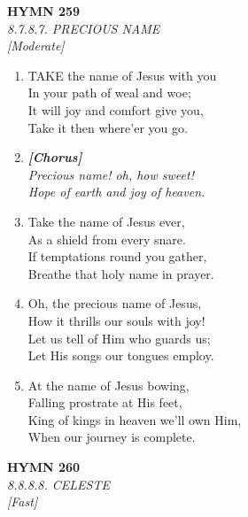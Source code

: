 \newpage
\begin{center}
    {\Large \textbf{HYMN 259}}
    \\
    \textit{8.7.8.7. PRECIOUS NAME}
    \\
    \textit{\small [Moderate]}
\end{center}
\vspace{1em}

\begin{enumerate}
    \item TAKE the name of Jesus with you \\
            In your path of weal and woe; \\
        It will joy and comfort give you, \\
            Take it then where'er you go.

    \item[] \vspace{0.4em}
    \textbf{\textit{[Chorus]}} \\
    \textit{Precious name! oh, how sweet!} \\
    \textit{Hope of earth and joy of heaven.}
    \vspace{0.4em}

    \item Take the name of Jesus ever, \\
            As a shield from every snare. \\
        If temptations round you gather, \\
            Breathe that holy name in prayer.

    \item Oh, the precious name of Jesus, \\
            How it thrills our souls with joy! \\
        Let us tell of Him who guards us; \\
            Let His songs our tongues employ.

    \item At the name of Jesus bowing, \\
            Falling prostrate at His feet, \\
        King of kings in heaven we'll own Him, \\
            When our journey is complete.

\end{enumerate}

\newpage
\begin{center}
    {\Large \textbf{HYMN 260}}
    \\
    \textit{8.8.8.8. CELESTE}
    \\
    \textit{\small [Fast]}
\end{center}
\vspace{1em}

